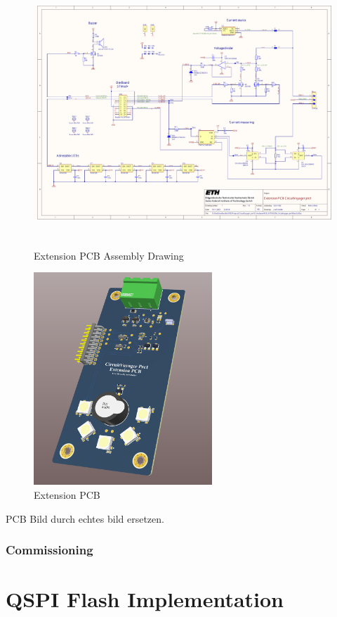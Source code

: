 \begin{figure}[H]
	\centering
	\includegraphics[height=10cm, page=2]{../../../5_Hardware/PCB_EXTENSION_CircuitVoyager_pre1/Project Outputs for PCB_EXT_CV_PRE1/PCB_EXTENSION_CircuitVoyager_pre1.pdf}
	\caption{Extension PCB Assembly Drawing}
	\label{fig:Extension PCB Assembly Drawing}
\end{figure}



\begin{figure}[H]
	\centering
	\includegraphics[height=8cm]{Resources/PCB.png}
	\caption{Extension PCB}
	\label{fig:Extension PCB}
\end{figure}
PCB Bild durch echtes bild ersetzen.

\newpage
\subsubsection{Commissioning}



\section{QSPI Flash Implementation}